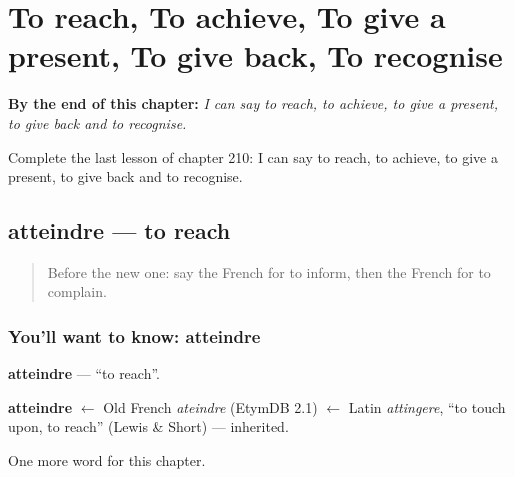 
\chapter{To reach, To achieve, To give a present, To give back, To recognise}
\label{ch:fr-to-reach-to-achieve-to-give-a-present-to-give-back-to-recognise}

\begin{chapteropening}
\textbf{By the end of this chapter:} \emph{I can say to reach, to achieve, to give a present, to give back and to recognise.}

Complete the last lesson of chapter 210: I can say to reach, to achieve, to give a present, to give back and to recognise.
\end{chapteropening}

\section[atteindre]{atteindre — to reach}

\label{lesson:FR-C210-atteindre}



\begin{quote}
Before the new one: say the French for to inform, then the French for to complain.
\end{quote}

\subsection*{You'll want to know: atteindre}
\textbf{atteindre} — \textquotedblleft{}to reach\textquotedblright{}.

\begin{cousinweb}
\textbf{atteindre} $\leftarrow$ Old French \emph{ateindre} (EtymDB 2.1) $\leftarrow$ Latin \emph{attingere}, \textquotedblleft{}to touch upon, to reach\textquotedblright{} (Lewis \& Short) — inherited.
\end{cousinweb}

\begin{grammarlens}[title={What you've built}]
One more word for this chapter.
\end{grammarlens}

